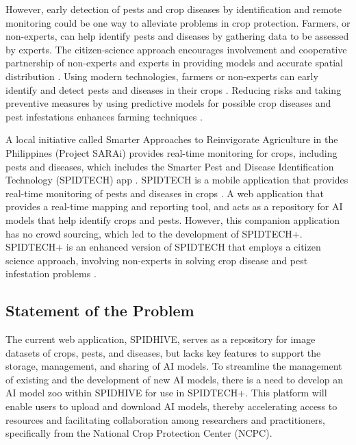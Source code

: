 \documentclass{icsthesis}
\begin{document}
\begin{mainmatter}
            However, early detection of pests and crop diseases by identification and remote monitoring could be one way to alleviate problems in crop protection. Farmers, or non-experts, can help identify pests and diseases by gathering data to be assessed by experts. The citizen-science approach encourages involvement and cooperative partnership of non-experts and experts in providing models and accurate spatial distribution \cite{Sullivan_Aycrigg_Barry_Bonney_Bruns_Cooper_Damoulas_Dhondt_Dietterich_Farnsworth_etal._2013}. Using modern technologies, farmers or non-experts can early identify and detect pests and diseases in their crops \cite{mique-2018}. Reducing risks and taking preventive measures by using predictive models for possible crop diseases and pest infestations enhances farming techniques \cite{Mastul_Awae_Bara_Yaro_2023}.

            A local initiative called Smarter Approaches to Reinvigorate Agriculture in the Philippines (Project SARAi) provides real-time monitoring for crops, including pests and diseases, which includes the Smarter Pest and Disease Identification Technology (SPIDTECH) app \cite{dvi-databank}. SPIDTECH is a mobile application that provides real-time monitoring of pests and diseases in crops \cite{Guiam_Gutierrez_Gapasin_Matalog_Ebuenga_2021}. A web application that provides a real-time mapping and reporting tool, and acts as a repository for AI models that help identify crops and pests. However, this companion application has no crowd sourcing, which led to the development of SPIDTECH+. SPIDTECH+ is an enhanced version of SPIDTECH that employs a citizen science approach, involving non-experts in solving crop disease and pest infestation problems \cite{belleza-2025}.
            
			\subsection{Statement of the Problem}
            The current web application, SPIDHIVE, serves as a repository for image datasets of crops, pests, and diseases, but lacks key features to support the storage, management, and sharing of AI models. To streamline the management of existing and the development of new AI models, there is a need to develop an AI model zoo within SPIDHIVE for use in SPIDTECH+. This platform will enable users to upload and download AI models, thereby accelerating access to resources and facilitating collaboration among researchers and practitioners, specifically from the National Crop Protection Center (NCPC).
            

\end{mainmatter}
\end{document}
